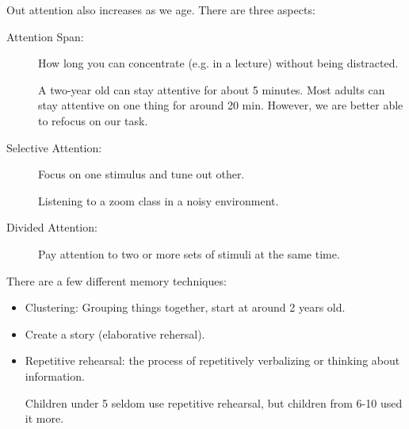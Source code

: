 \documentclass[../main/main.tex]{subfiles}
\begin{document}
    Out attention also increases as we age. There are three aspects:

    \begin{description}
	    \item[Attention Span:] How long you can concentrate (e.g. in a lecture) without being distracted.
    \begin{example}
A two-year old can stay attentive for about 5 minutes. Most adults can stay attentive on one thing for around 20 min. However, we are better able to refocus on our task.
                                    \end{example}
    \item[Selective Attention:] Focus on one stimulus and tune out other.
    \begin{example}
Listening to a zoom class in a noisy environment.
                                    \end{example}
    \item[Divided Attention:] Pay attention to two or more sets of stimuli at the same time.
    \end{description}

There are a few different memory techniques:
    \begin{itemize}
\item Clustering: Grouping things together, start at around 2 years old.
\item Create a story (elaborative rehersal).
    \item Repetitive rehearsal: the process of repetitively verbalizing or thinking about information.
    \begin{example}
Children under 5 seldom use repetitive rehearsal, but children from 6-10 used it more.
                                    \end{example}

    \end{itemize}
\end{document}
